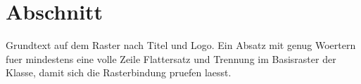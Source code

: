\documentclass{swisstex}
\begin{document}

\section{Abschnitt}
Grundtext auf dem Raster nach Titel und Logo. Ein Absatz mit genug Woertern
fuer mindestens eine volle Zeile Flattersatz und Trennung im Basisraster
der Klasse, damit sich die Rasterbindung pruefen laesst.
\end{document}

